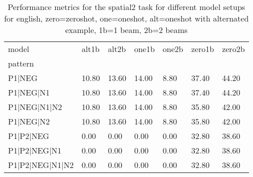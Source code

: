 \begin{table}[h]
\begin{tabular}{l|llllll}
\toprule
model & alt1b & alt2b & one1b & one2b & zero1b & zero2b \\
pattern &  &  &  &  &  &  \\
\midrule
P1|NEG & 10.80 & 13.60 & 14.00 & 8.80 & 37.40 & 44.20 \\
P1|NEG|N1 & 10.80 & 13.60 & 14.00 & 8.80 & 37.40 & 44.20 \\
P1|NEG|N1|N2 & 10.80 & 13.60 & 14.00 & 8.80 & 35.80 & 42.00 \\
P1|NEG|N2 & 10.80 & 13.60 & 14.00 & 8.80 & 35.80 & 42.00 \\
P1|P2|NEG & 0.00 & 0.00 & 0.00 & 0.00 & 32.80 & 38.60 \\
P1|P2|NEG|N1 & 0.00 & 0.00 & 0.00 & 0.00 & 32.80 & 38.60 \\
P1|P2|NEG|N1|N2 & 0.00 & 0.00 & 0.00 & 0.00 & 32.80 & 38.60 \\
\bottomrule
\end{tabular}
\caption{Performance metrics for the spatial2 task for different model setups for english, zero=zeroshot, one=oneshot, alt=oneshot with alternated example, 1b=1 beam, 2b=2 beams}
\label{tab:en_spatial2_performance}
\end{table}
